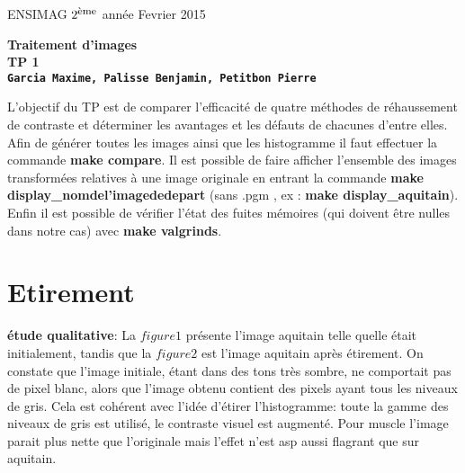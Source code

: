 \documentclass[12pt]{article}
\newcommand{\noi}{\noindent}
\numberwithin{equation}{section}
\begin{document}
\baselineskip7mm

\noi ENSIMAG $2^{\footnotesize \mbox{ème}}$ année   \hfill Fevrier 2015


\vspace{1cm}


\begin{center}
{\Large \bf Traitement d'images\\ TP 1 \\ \texttt{Garcia Maxime, Palisse Benjamin, Petitbon Pierre}}
\end{center}

\vspace{5mm}

L'objectif du TP est de comparer l'efficacité de quatre méthodes de réhaussement de contraste et déterminer les avantages et les défauts de chacunes d'entre elles. Afin de générer toutes les images ainsi que les histogramme il faut effectuer la commande \textbf{make compare}. Il est possible de faire afficher l'ensemble des images transformées relatives à une image originale en entrant la commande \textbf{make display\_nomdel'imagededepart} (sans .pgm , ex : \textbf{make display\_aquitain}). Enfin il est possible de vérifier l'état des fuites mémoires (qui doivent être nulles dans notre cas) avec \textbf{make valgrinds}.  

\section{Etirement}

\textbf{étude qualitative}: La $figure 1$ présente l'image aquitain telle quelle était initialement, tandis que la $figure 2$ est l'image aquitain après étirement. On constate que l'image initiale, étant dans des tons très sombre, ne comportait pas de pixel blanc, alors que l'image obtenu contient des pixels ayant tous les niveaux de gris. Cela est cohérent avec l'idée d'étirer l'histogramme: toute la gamme des niveaux de gris est utilisé, le contraste visuel est augmenté. Pour muscle l'image parait plus nette que l'originale mais l'effet n'est asp aussi flagrant que sur aquitain.\\
\end{document}
